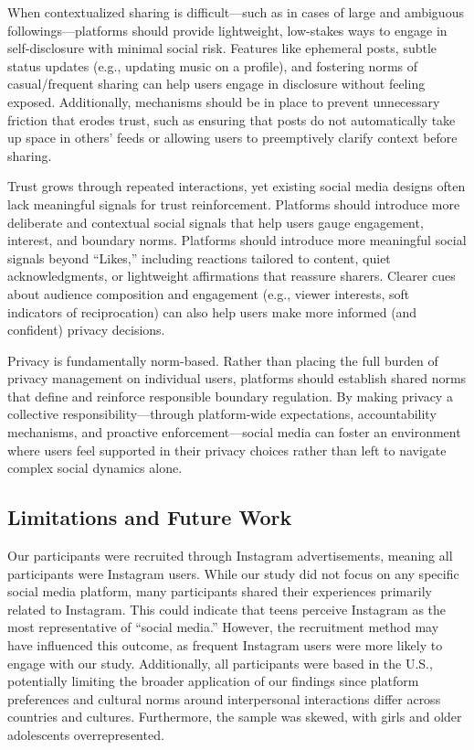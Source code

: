  When contextualized sharing is difficult---such as in cases of large and ambiguous followings---platforms should provide lightweight, low-stakes ways to engage in self-disclosure with minimal social risk. Features like ephemeral posts, subtle status updates (e.g., updating music on a profile), and fostering norms of casual/frequent sharing can help users engage in disclosure without feeling exposed. Additionally, mechanisms should be in place to prevent unnecessary friction that erodes trust, such as ensuring that posts do not automatically take up space in others' feeds or allowing users to preemptively clarify context before sharing.    

 Trust grows through repeated interactions, yet existing social media designs often lack meaningful signals for trust reinforcement. Platforms should introduce more deliberate and contextual social signals that help users gauge engagement, interest, and boundary norms. Platforms should introduce more meaningful social signals beyond ``Likes,'' including reactions tailored to content, quiet acknowledgments, or lightweight affirmations that reassure sharers. Clearer cues about audience composition and engagement (e.g., viewer interests, soft indicators of reciprocation) can also help users make more informed (and confident) privacy decisions.

 Privacy is fundamentally norm-based. Rather than placing the full burden of privacy management on individual users, platforms should establish shared norms that define and reinforce responsible boundary regulation. By making privacy a collective responsibility---through platform-wide expectations, accountability mechanisms, and proactive enforcement---social media can foster an environment where users feel supported in their privacy choices rather than left to navigate complex social dynamics alone.



\subsection{Limitations and Future Work}
Our participants were recruited through Instagram advertisements, meaning all participants were Instagram users. While our study did not focus on any specific social media platform, many participants shared their experiences primarily related to Instagram. This could indicate that teens perceive Instagram as the most representative of ``social media.'' However, the recruitment method may have influenced this outcome, as frequent Instagram users were more likely to engage with our study. Additionally, all participants were based in the U.S., potentially limiting the broader application of our findings since platform preferences and cultural norms around interpersonal interactions differ across countries and cultures. Furthermore, the sample was skewed, with girls and older adolescents overrepresented.

